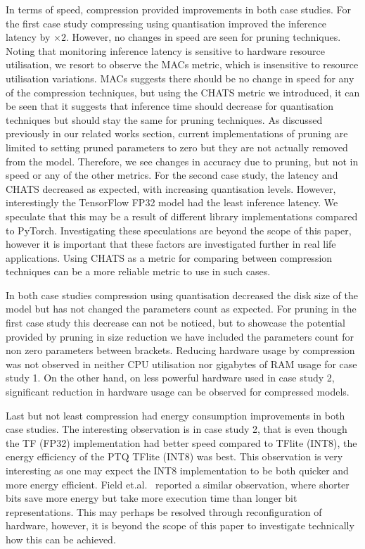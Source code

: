 In terms of speed, compression provided improvements in both case studies.  
%
For the first case study compressing using quantisation improved the inference latency by $\times 2$. However, no changes in speed are seen for pruning techniques.
%
Noting that monitoring inference latency is sensitive to hardware resource utilisation, we resort to observe the MACs metric, which is insensitive to resource utilisation variations. 
MACs suggests there should be no change in speed for any of the compression techniques, but using the CHATS metric we introduced, it can be seen that it suggests that inference time should decrease for quantisation techniques but should stay the same for pruning techniques.
As discussed previously in our related works section, current implementations of pruning are limited to setting pruned parameters to zero but they are not actually removed from the model. Therefore, we see changes in accuracy due to pruning, but not in speed or any of the other metrics. 
%
For the second case study, the latency and CHATS decreased as expected, with increasing quantisation levels. 
%
However, interestingly the TensorFlow FP32 model had the least inference latency.  
%
We speculate that this may be a result of different library implementations compared to PyTorch. 
%
Investigating these speculations are beyond the scope of this paper, however it is important that these factors are investigated further in real life applications.
%
Using CHATS as a metric for comparing between compression techniques can be a more reliable metric to use in such cases.

In both case studies compression using quantisation decreased the disk size of the model but has not changed the parameters count as expected. 
%
For pruning in the first case study this decrease can not be noticed, but to showcase the potential provided by pruning in size reduction we have included the parameters count for non zero parameters between brackets.
%
Reducing hardware usage by compression was not observed in neither CPU utilisation nor gigabytes of RAM usage for case study 1.
%
On the other hand, on less powerful hardware used in case study 2, significant reduction in hardware usage can be observed for compressed models.

Last but not least compression had energy consumption improvements in both case studies. The interesting observation is in case study 2, that is even though the TF (FP32) implementation had better speed compared to TFlite (INT8), the energy efficiency of the PTQ TFlite (INT8) was best.  
%
This observation is very interesting as one may expect the INT8 implementation to be both quicker and more energy efficient. 
%
Field et.al.~\cite{Field2014} reported a similar observation, where shorter bits save more energy but take more execution time than longer bit representations. 
%
This may perhaps be resolved through reconfiguration of hardware, however, it is beyond the scope of this paper to investigate technically how this can be achieved.


